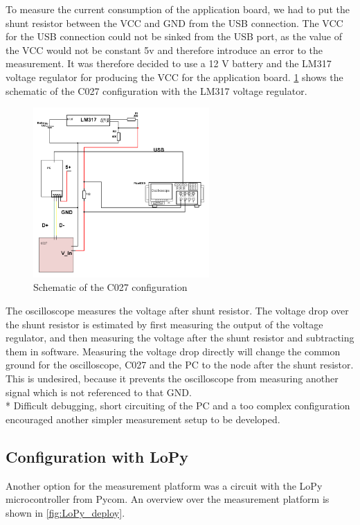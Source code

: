 To measure the current consumption of the application board, we had to put the shunt resistor between the VCC and GND from the USB connection. The VCC for the USB connection could not be sinked from the USB port, as the value of the VCC would not be constant 5v and therefore introduce an error to the measurement. It was therefore decided to use a 12 V battery and the LM317 voltage regulator for producing the VCC for the application board. \ref{fig:Schematic_C027} shows the schematic of the C027 configuration with the LM317 voltage regulator. 

\begin{figure}[H]
\centering
\includegraphics[height=6.5cm]{Project_Report/Images/C027_Schematic.png}
\caption{Schematic of the C027 configuration}
\label{fig:Schematic_C027}
\end{figure}

The oscilloscope measures the voltage after shunt resistor. The voltage drop over the shunt resistor is estimated by first measuring the output of the voltage regulator, and then measuring the voltage after the shunt resistor and subtracting them in software. Measuring the voltage drop directly will change the common ground for the oscilloscope, C027 and the PC to the node after the shunt resistor. This is undesired, because it prevents the oscilloscope from measuring another signal which is not referenced to that GND. 
\\*
Difficult debugging, short circuiting of the PC and a too complex configuration encouraged another simpler measurement setup to be developed. 



\subsection{Configuration with LoPy}
Another option for the measurement platform was a circuit with the LoPy microcontroller from Pycom. An overview over the measurement platform is shown in \ref{fig:LoPy_deploy}. 

